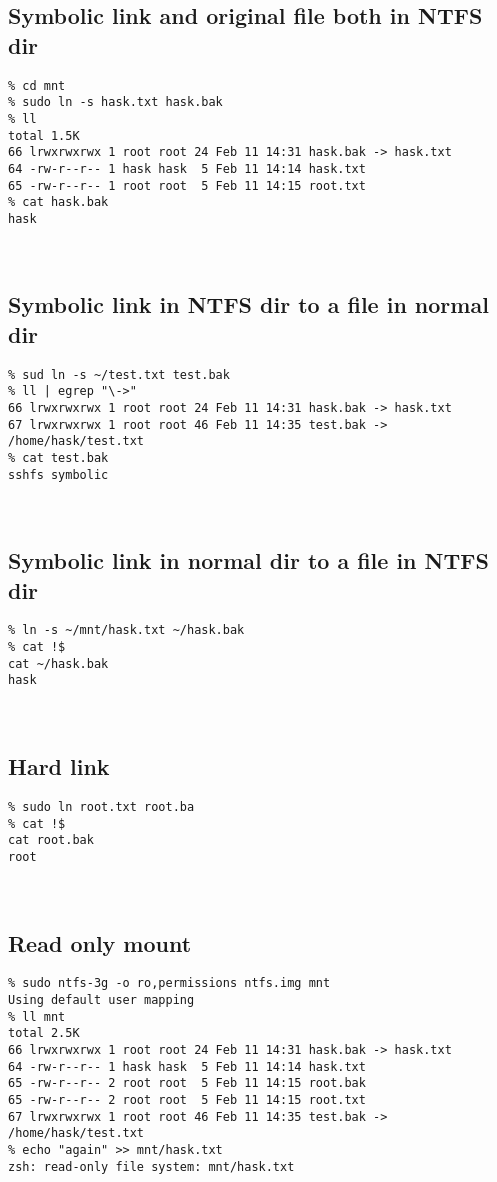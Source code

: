 \documentclass[a4paper]{report}
\begin{document}
\subsection{Symbolic link and original file both in NTFS dir}
\begin{lstlisting}
% cd mnt
% sudo ln -s hask.txt hask.bak
% ll                         
total 1.5K
66 lrwxrwxrwx 1 root root 24 Feb 11 14:31 hask.bak -> hask.txt
64 -rw-r--r-- 1 hask hask  5 Feb 11 14:14 hask.txt
65 -rw-r--r-- 1 root root  5 Feb 11 14:15 root.txt
% cat hask.bak              
hask
\end{lstlisting}\null\\
\subsection{Symbolic link in NTFS dir to a file in normal dir}
\begin{lstlisting}
% sud ln -s ~/test.txt test.bak
% ll | egrep "\->"
66 lrwxrwxrwx 1 root root 24 Feb 11 14:31 hask.bak -> hask.txt
67 lrwxrwxrwx 1 root root 46 Feb 11 14:35 test.bak -> /home/hask/test.txt
% cat test.bak
sshfs symbolic
\end{lstlisting}\null\\
\subsection{Symbolic link in normal dir to a file in NTFS dir}
\begin{lstlisting}
% ln -s ~/mnt/hask.txt ~/hask.bak
% cat !$                        
cat ~/hask.bak
hask
\end{lstlisting}\null\\
\subsection{Hard link}
\begin{lstlisting}
% sudo ln root.txt root.ba
% cat !$                 
cat root.bak
root
\end{lstlisting}\null\\
\subsection{Read only mount}
\begin{lstlisting}
% sudo ntfs-3g -o ro,permissions ntfs.img mnt
Using default user mapping
% ll mnt                            
total 2.5K
66 lrwxrwxrwx 1 root root 24 Feb 11 14:31 hask.bak -> hask.txt
64 -rw-r--r-- 1 hask hask  5 Feb 11 14:14 hask.txt
65 -rw-r--r-- 2 root root  5 Feb 11 14:15 root.bak
65 -rw-r--r-- 2 root root  5 Feb 11 14:15 root.txt
67 lrwxrwxrwx 1 root root 46 Feb 11 14:35 test.bak -> /home/hask/test.txt
% echo "again" >> mnt/hask.txt       
zsh: read-only file system: mnt/hask.txt
\end{lstlisting}\null\\
\end{document}
